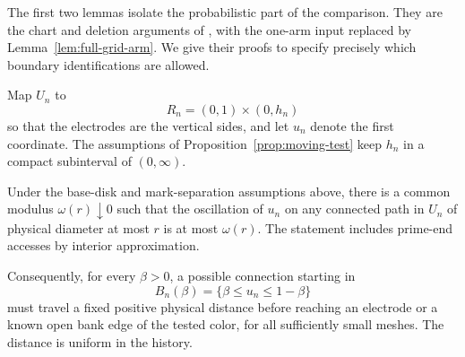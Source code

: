 The first two lemmas isolate the probabilistic part of the comparison.
They are the chart and deletion arguments of
\cite[Section ``Alternating tests after exploration'']{C}, with the
one-arm input replaced by Lemma~\ref{lem:full-grid-arm}.  We give their
proofs to specify precisely which boundary identifications are allowed.

Map $U_n$ to
\[
 R_n=(0,1)\times(0,h_n)
\]
so that the electrodes are the vertical sides, and let $u_n$ denote
the first coordinate.  The assumptions of
Proposition~\ref{prop:moving-test} keep $h_n$ in a compact subinterval
of $(0,\infty)$.

\begin{lemma}
\label{lem:slits-chart}
Under the base-disk and mark-separation assumptions above, there is a
common modulus $\omega(r)\downarrow0$ such that the oscillation of
$u_n$ on any connected path in $U_n$ of physical diameter at most $r$
is at most $\omega(r)$.  The statement includes prime-end accesses by
interior approximation.

Consequently, for every $\beta>0$, a possible connection starting in
\begin{equation}\label{eq:slits-wide-band}
 B_n(\beta)=\{\beta\leq u_n\leq1-\beta\}
\end{equation}
must travel a fixed positive physical distance before reaching an
electrode or a known open bank edge of the tested color, for all
sufficiently small meshes.  The distance is uniform in the history.
\end{lemma}

